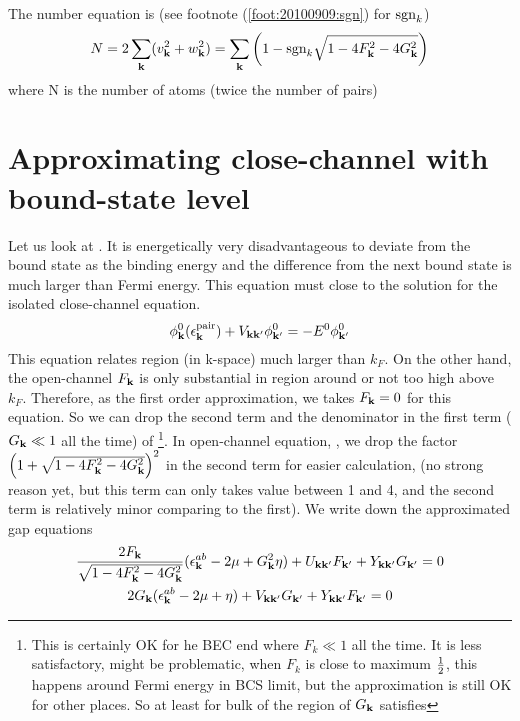 The number equation is (see footnote (\ref{foot:20100909:sgn}) for $\text{sgn}_{k}$)
\begin{equation}\label{eq:20100909:number}
N=2\sum_{\mathbf{k}}(v_{\mathbf{k}}^{2}+w_{\mathbf{k}}^{2})=\sum_{\mathbf{k}}\left(1-\text{sgn}_{k}\sqrt{1-4 F_{\mathbf{k}}^2-4 G_{\mathbf{k}}^2}\right)
\end{equation} 
where N is the number of atoms (twice  the number of pairs)

\section{Approximating close-channel with bound-state level}
Let us look at .  It is energetically very disadvantageous to deviate from the bound state as the binding energy and the difference from the next bound state is much  larger than Fermi energy.     This equation must close to  the solution for the isolated close-channel \sch equation.  
\begin{equation}\label{eq:20100915:twobody}
{\phi^{0}_{\ensuremath{\mathbf{k}}}}(\epsilon^{\text{pair}}_{\mathbf{k}})+V_{\mathbf{k}\mathbf{k}'}\phi^{0}_{\mathbf{k}'}=-E^{0}\phi^{0}_{\mathbf{k}'}
\end{equation}
This equation relates region (in k-space) much larger than $k_{F}$.  On the other hand, the open-channel 
$F_{\mathbf{k}}$ is only substantial in region around or not too high above  $k_{F}$.  Therefore, as the first order approximation, we takes $F_{\mathbf{k}}=0$ for this equation. So we can drop the second term and the denominator in the first term ($G_{\mathbf{k}}\ll1$ all the time) of \footnote{ This is certainly OK for he BEC end where $F_{k}\ll1$ all the time.  It is less satisfactory, might be problematic,  when $F_{k}$ is close to maximum $\frac{1}{2}$, this happens around Fermi energy in BCS limit, but the approximation is still OK for other places. So at least for bulk of the region of $G_{\mathbf{k}}$ satisfies }.  In  open-channel equation, , we drop the factor $\left(1+\sqrt{1-4 F_{\mathbf{k}}^2-4 G_{\mathbf{k}}^2}\right)^2$ in the second term for easier calculation, (no strong reason yet, but this term can only takes value between 1 and 4, and the second term is relatively minor comparing to the first). We write down the approximated gap equations
\begin{subequations}\label{eq:20100915:gap}
\begin{gather}\label{eq:20100915:gapa}
\frac{2F_{\mathbf{k}}}{\sqrt{1-4 F_{\mathbf{k}}^2-4 G_{\mathbf{k}}^2}} (\epsilon^{ab}_{\mathbf{k}}-2\mu+  G_{\mathbf{k}}^2\eta)+U_{\mathbf{k}\mathbf{k}'}F_{\mathbf{k}'}+Y_{\mathbf{k}\mathbf{k}'}G_{\mathbf{k}'}=0\\
\label{eq:20100915:gapb}
{2G_{\ensuremath{\mathbf{k}}}}(\epsilon^{ab}_{\mathbf{k}}-2\mu+\eta)+V_{\mathbf{k}\mathbf{k}'}G_{\mathbf{k}'}+Y_{\mathbf{k}\mathbf{k}'}F_{\mathbf{k}'}=0
\end{gather}
\end{subequations}
